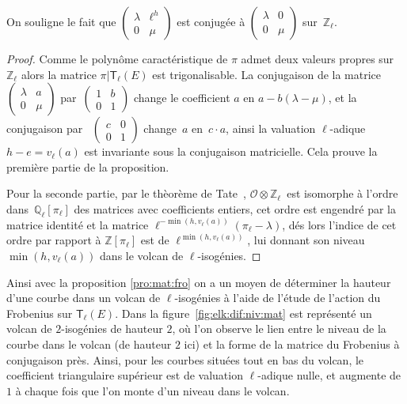 \documentclass[10pt,a4paper]{book}
\theoremstyle{plain}
\theoremstyle{definition}
\theoremstyle{definition}
\theoremstyle{definition}
\theoremstyle{definition}
\theoremstyle{remark}
\theoremstyle{remark}
\theoremstyle{definition}
\begin{document}
On souligne le fait que $\left(\begin{smallmatrix} \lambda & \ell^h \\ 0 &
\mu \end{smallmatrix}\right)$ est conjugée à $\left(\begin{smallmatrix} \lambda & 0 \\ 0 & \mu\end{smallmatrix}\right)$ sur~$\mathbb{Z}_{\ell}$.
\begin{proof}
Comme le polynôme caractéristique de $\pi$ admet deux valeurs propres sur 
$\mathbb{Z}_{\ell}$ alors la matrice $\pi|\mathsf{T}_{\ell}(E)$ est trigonalisable. 
La conjugaison de la matrice $\left ( \begin{smallmatrix}\lambda & a\\0 & \mu
\end{smallmatrix}\right )$ par~$\left ( \begin{smallmatrix}1 & b\\0 & 1
\end{smallmatrix} \right )$ change le coefficient $a$ en $a-b (\lambda - \mu)$, 
et la conjugaison par ~$\left(\begin{smallmatrix} c & 0 \\ 0 &
1\end{smallmatrix}\right)$ change~$a$ en~$c \cdot a$,
ainsi la valuation $\ell$-adique~$h-e = v_{\ell}(a)$ est invariante sous la 
conjugaison matricielle. Cela prouve la première partie de la proposition. 

Pour la seconde partie, par le thèorème de 
Tate~\cite[Isogeny theorem III.7.7 (a)]{Silv1}, $\mathcal{O} \otimes 
 \mathbb{Z}_{\ell}$~est isomorphe à l'ordre dans~$\mathbb{Q}_{\ell}[\pi_{\ell}]$
des matrices avec coefficients entiers, cet ordre est engendré par la matrice 
 identité et la matrice $\ell^{-\min (h, v_\ell(a))} (\pi_{\ell}-\lambda)$, dés 
 lors l'indice de cet ordre par rapport à $\mathbb{Z}[\pi_{\ell}]$ est de 
$\ell^{\min (h, v_\ell(a))}$, lui donnant son niveau $\min (h, v_\ell(a))$ dans 
 le volcan de $\ell$-isogénies.
\end{proof}

Ainsi avec la proposition \ref{pro:mat:fro} on a un moyen de déterminer la 
hauteur d'une courbe dans un volcan de $\ell$-isogénies à l'aide de l'étude de 
l'action du Frobenius sur $\mathsf{T}_{\ell}(E)$. Dans la 
figure~\ref{fig:elk:dif:niv:mat} est représenté un volcan de $2$-isogénies 
de hauteur $2$, où l'on observe le lien entre le niveau de la courbe dans le 
volcan (de hauteur $2$ ici) et la forme de la matrice du Frobenius à conjugaison 
près. Ainsi, pour les courbes situées tout en bas du volcan, le coefficient 
triangulaire supérieur est de valuation $\ell$-adique nulle, et augmente
de $1$ à chaque fois que l'on monte d'un niveau dans le volcan.
\end{document}
